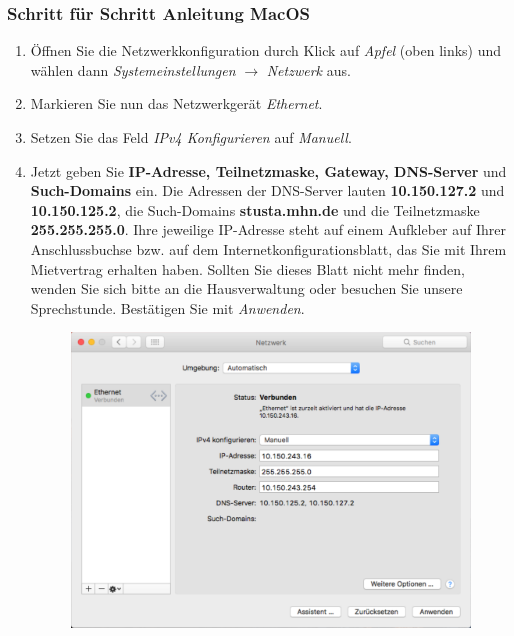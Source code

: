 \documentclass[a4paper,12pt]{scrartcl}
\begin{document}
\subsubsection*{Schritt für Schritt Anleitung MacOS}
\begin{enumerate}
    \item Öffnen Sie die Netzwerkkonfiguration durch Klick auf \emph{Apfel} (oben links) und wählen dann \emph{Systemeinstellungen} $\rightarrow$ \emph{Netzwerk} aus.
    \item Markieren Sie nun das Netzwerkgerät \emph{Ethernet}.
    \item Setzen Sie das Feld \emph{IPv4 Konfigurieren} auf \emph{Manuell}.
    \item Jetzt geben Sie \textbf{IP-Adresse, Teilnetzmaske, Gateway, DNS-Server} und \textbf{Such-Domains} ein. Die Adressen der DNS-Server lauten \textbf{10.150.127.2} und \textbf{10.150.125.2}, die Such-Domains \textbf{stusta.mhn.de} und die Teilnetzmaske \textbf{255.255.255.0}. Ihre jeweilige IP-Adresse steht auf einem Aufkleber auf Ihrer Anschlussbuchse bzw. auf dem Internetkonfigurationsblatt, das Sie mit Ihrem Mietvertrag erhalten haben. Sollten Sie dieses Blatt nicht mehr finden, wenden Sie sich bitte an die Hausverwaltung oder besuchen Sie unsere Sprechstunde. Bestätigen Sie mit \emph{Anwenden}.
      \begin{figure}[h!]
      \centering
        \begin{minipage}[c]{0.60\linewidth}
          \centering
          \includegraphics[width=0.9\linewidth,keepaspectratio]{Bilder/IP_MAC}
        \end{minipage}
      \vspace{-20pt}
      \end{figure}
\end{enumerate}
\vspace{-10pt}
\end{document}
